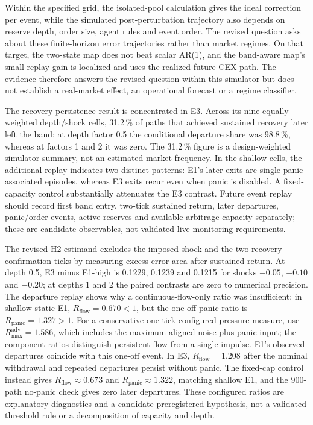 Within the specified grid, the isolated-pool calculation gives the ideal correction per event, while the simulated post-perturbation trajectory also depends on reserve depth, order size, agent rules and event order. The revised question asks about these finite-horizon error trajectories rather than market regimes. On that target, the two-state map does not beat scalar AR(1), and the band-aware map's small replay gain is localized and uses the realized future CEX path. The evidence therefore answers the revised question within this simulator but does not establish a real-market effect, an operational forecast or a regime classifier.

The recovery-persistence result is concentrated in E3. Across its nine equally weighted depth/shock cells, 31.2\,\% of paths that achieved sustained recovery later left the band; at depth factor 0.5 the conditional departure share was 98.8\,\%, whereas at factors 1 and 2 it was zero. The 31.2\,\% figure is a design-weighted simulator summary, not an estimated market frequency. In the shallow cells, the additional replay indicates two distinct patterns: E1's later exits are single panic-associated episodes, whereas E3 exits recur even when panic is disabled. A fixed-capacity control substantially attenuates the E3 contrast. Future event replay should record first band entry, two-tick sustained return, later departures, panic/order events, active reserves and available arbitrage capacity separately; these are candidate observables, not validated live monitoring requirements.

The revised H2 estimand excludes the imposed shock and the two recovery-confirmation ticks by measuring excess-error area after sustained return. At depth 0.5, E3 minus E1-high is 0.1229, 0.1239 and 0.1215 for shocks $-0.05$, $-0.10$ and $-0.20$; at depths 1 and 2 the paired contrasts are zero to numerical precision. The departure replay shows why a continuous-flow-only ratio was insufficient: in shallow static E1, $R_{\mathrm{flow}}=0.670<1$, but the one-off panic ratio is $R_{\mathrm{panic}}=1.327>1$. For a conservative one-tick configured pressure measure, use $R_{\max}^{\mathrm{adv}}=1.586$, which includes the maximum aligned noise-plus-panic input; the component ratios distinguish persistent flow from a single impulse. E1's observed departures coincide with this one-off event. In E3, $R_{\mathrm{flow}}=1.208$ after the nominal withdrawal and repeated departures persist without panic. The fixed-cap control instead gives $R_{\mathrm{flow}}\approx0.673$ and $R_{\mathrm{panic}}\approx1.322$, matching shallow E1, and the 900-path no-panic check gives zero later departures. These configured ratios are explanatory diagnostics and a candidate preregistered hypothesis, not a validated threshold rule or a decomposition of capacity and depth.

